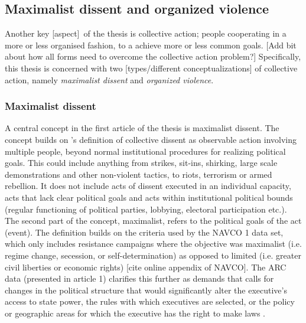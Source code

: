 \documentclass[12pt]{article}
\begin{document}
\subsection{Maximalist dissent and organized violence}
\label{Maximalist dissent and organized violence}

Another key [aspect] of the thesis is collective action; people cooperating in a
more or less organised fashion, to a achieve more or less common goals. [Add bit
about how all forms need to overcome the collective action problem?]
Specifically, this thesis is concerned with two [types/different
conceptualizations] of collective action, namely \textit{maximalist dissent} and
\textit{organized violence}.

\subsubsection{Maximalist dissent} \label{Maximalist dissent}

A central concept in the first article of the thesis is maximalist dissent. The
concept builds on \citet{TillyCharles1978Fmtr}'s definition of collective
dissent as observable action involving multiple people, beyond normal
institutional procedures for realizing political goals. This could include
anything from strikes, sit-ins, shirking, large scale demonstrations and other
non-violent tactics, to riots, terrorism or armed rebellion. It does not include
acts of dissent executed in an individual capacity, acts that lack clear
political goals and acts within institutional political bounds (regular
functioning of political parties, lobbying, electoral participation etc.). The
second part of the concept, maximalist, refers to the political goals of the act
(event). The definition builds on the criteria used by the NAVCO 1 data set,
which only includes resistance campaigns where the objective was maximalist
(i.e. regime change, secession, or self-determination) as opposed to limited
(i.e. greater civil liberties or economic rights) [cite online appendix of
NAVCO]. The ARC data (presented in article 1) clarifies this further as demands
that calls for changes in the political structure that would significantly alter
the executive’s access to state power, the rules with which executives are
selected, or the policy or geographic areas for which the executive has the
right to make laws \citep{Butcher_2022}.
\end{document}
